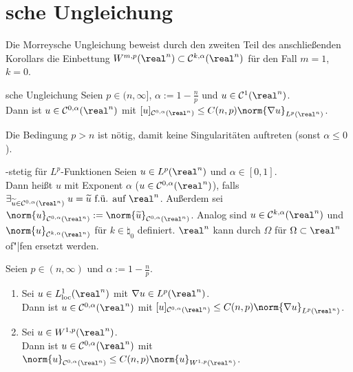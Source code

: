 \pagebreak

\section{%
    sche Ungleichung%
}

\begin{Bem}
    Die Morreysche Ungleichung beweist durch den zweiten Teil des anschließenden Korollars
    die Einbettung $W^{m,p}(\real^n) \subset \C^{k,\alpha}(\real^n)$ für den Fall
    $m = 1$, $k = 0$.
\end{Bem}

\begin{Satz}{sche Ungleichung}
    Seien $p \in (n, \infty]$, $\alpha := 1 - \frac{n}{p}$ und $u \in \C^1(\real^n)$.\\
    Dann ist $u \in \C^{0,\alpha}(\real^n)$ mit
    $[u]_{\C^{0,\alpha}(\real^n)} \le C(n,p) \norm{\nabla u}_{L^p(\real^n)}$.
\end{Satz}

\begin{Bem}
    Die Bedingung $p > n$ ist nötig, damit keine Singularitäten auftreten
    (sonst $\alpha \le 0$).
\end{Bem}

\linie

\begin{Def}{-stetig für $L^p$-Funktionen}
    Seien $u \in L^p(\real^n)$ und $\alpha \in [0, 1]$.\\
    Dann heißt $u$  mit Exponent $\alpha$
    ($u \in \C^{0,\alpha}(\real^n)$), falls
    $\exists_{\widetilde{u} \in \C^{0,\alpha}(\real^n)}\;
    u = \widetilde{u} \text{ f.ü. auf } \real^n$.
    Außerdem sei $\norm{u}_{\C^{0,\alpha}(\real^n)} :=
    \norm{\widetilde{u}}_{\C^{0,\alpha}(\real^n)}$.
    Analog sind $u \in \C^{k,\alpha}(\real^n)$ und $\norm{u}_{\C^{k,\alpha}(\real^n)}$
    für $k \in \natural_0$ definiert.
    $\real^n$ kann durch $\Omega$ für $\Omega \subset \real^n$ of"|fen ersetzt werden.
\end{Def}

\begin{Kor}
    Seien $p \in (n, \infty)$ und $\alpha := 1 - \frac{n}{p}$.
    \begin{enumerate}
        \item
        Sei $u \in L^1_\loc(\real^n)$ mit $\nabla u \in L^p(\real^n)$.\\
        Dann ist $u \in \C^{0,\alpha}(\real^n)$ mit
        $[u]_{\C^{0,\alpha}(\real^n)} \le C(n,p) \norm{\nabla u}_{L^p(\real^n)}$.

        \item
        Sei $u \in W^{1,p}(\real^n)$.\\
        Dann ist $u \in \C^{0,\alpha}(\real^n)$ mit
        $\norm{u}_{\C^{0,\alpha}(\real^n)} \le C(n,p) \norm{u}_{W^{1,p}(\real^n)}$.
    \end{enumerate}
\end{Kor}

